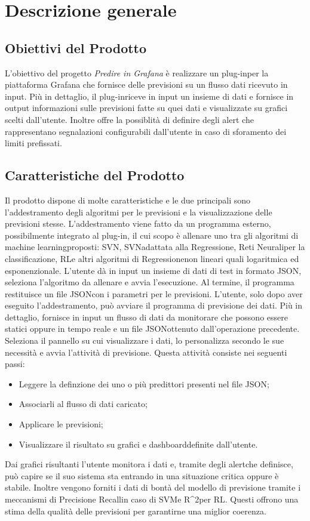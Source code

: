 \section{Descrizione generale}
	\subsection{Obiettivi del Prodotto}
	L'obiettivo del progetto \textit{Predire in Grafana} è realizzare un plug-in\glosp per la piattaforma Grafana che fornisce delle previsioni su un flusso dati ricevuto in input.
	Più in dettaglio, il plug-in\glosp riceve in input un insieme di dati e fornisce in output informazioni sulle previsioni fatte su quei dati e visualizzate su grafici scelti dall'utente. Inoltre offre la possiblità di definire degli alert che rappresentano segnalazioni configurabili dall'utente in caso di sforamento dei limiti prefissati. 
	\subsection{Caratteristiche del Prodotto}
	Il prodotto dispone di molte caratteristiche e le due principali sono l'addestramento degli algoritmi per le previsioni e la visualizzazione delle previsioni stesse.
	L'addestramento viene fatto da un programma esterno, possibilmente integrato al plug-in, il cui scopo è allenare uno tra gli algoritmi di machine learning\glosp proposti: SVN\glosp, SVN\glosp adattata alla Regressione\glo, Reti Neurali\glosp per la classificazione, RL\glo e altri algoritmi di Regressione\glosp non lineari quali logaritmica ed esponenzionale. L'utente dà in input un insieme di dati di test in formato JSON\glosp, seleziona l'algoritmo da allenare e avvia l'esecuzione. Al termine, il programma restituisce un file JSON\glosp con i parametri per le previsioni.
	L'utente, solo dopo aver eseguito l'addestramento, può avviare il programma di previsione dei dati. Più in dettaglio, fornisce in input un flusso di dati da monitorare che possono essere statici oppure in tempo reale e un file JSON\glosp ottenuto dall'operazione precedente. Seleziona il pannello su cui visualizzare i dati, lo personalizza secondo le sue necessità e avvia l'attività di previsione. Questa attività consiste nei seguenti passi:
	\begin{itemize}
		\item Leggere la definzione dei uno o più predittori presenti nel file JSON\glosp;
		\item Associarli al flusso di dati caricato;
		\item Applicare le previsioni;
		\item Visualizzare il risultato su grafici e dashboard\glosp definite dall'utente.
	\end{itemize}
	Dai grafici risultanti l'utente monitora i dati e, tramite degli alert\glosp che definisce, può capire se il suo sistema sta entrando in una situazione critica oppure è stabile.
	Inoltre vengono forniti i dati di bontà del modello di previsione tramite i meccanismi di Precision\glosp e Recall\glosp in caso di SVM\glosp e R^2\glosp per RL\glosp. Questi offrono una stima della qualità delle previsioni per garantirne una miglior coerenza.
